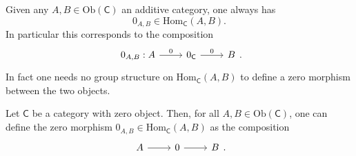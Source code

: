 \documentclass[../Main]{subfiles}
\begin{document}
\begin{rem}
	Given any $A, B \in \mathrm{Ob} \left(\mathsf{C}\right)$ an additive category, one always has
	\begin{equation}
	0_{A,B} \in \mathrm{Hom}_{\mathsf{C}} \left( A, B \right)
	.\end{equation} 
	In particular this corresponds to the composition
	\begin{equation}
	\begin{tikzcd}
		0_{A,B} :
		A \arrow[r, "0", rightarrow] &
		0_{\mathsf{C}} \arrow[r, "0", rightarrow] &
		B
	\end{tikzcd}
	.\end{equation} 
	In fact one needs no group structure on $\mathrm{Hom}_{\mathsf{C}} \left( A, B \right)$
	to define a zero morphism between the two objects.
\end{rem}

\begin{defn}
	Let $\mathsf{C}$ be a category with zero object.
	Then, for all $A, B \in \mathrm{Ob} \left(\mathsf{C}\right)$,
	one can define the zero morphism 
	$0_{A,B} \in \mathrm{Hom}_{\mathsf{C}} \left( A, B \right)$ 
	as the composition
	\begin{equation}
		\begin{tikzcd}
		A \arrow[r, "", rightarrow] &
		0 \arrow[r, "", rightarrow] &
		B
		\end{tikzcd}
	.\end{equation} 
\end{defn}
\end{document}

